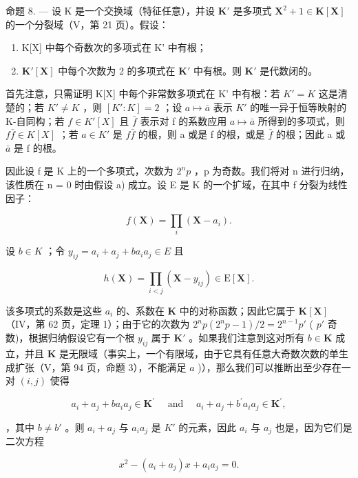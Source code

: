 命题 8. --- 设 K 是一个交换域（特征任意），并设 \(\mathbf{K}'\) 是多项式 \(\mathbf{X}^2 + 1 \in \mathbf{K}[\mathbf{X}]\) 的一个分裂域（V，第 21 页）。假设：

\begin{enumerate}
\def\labelenumi{\alph{enumi})}
\item
  K{[}X{]} 中每个奇数次的多项式在 K' 中有根；
\item
  \(\mathbf{K}'[\mathbf{X}]\) 中每个次数为 2 的多项式在 \(\mathbf{K}'\) 中有根。则 \(\mathbf{K}'\) 是代数闭的。
\end{enumerate}

首先注意，只需证明 K{[}X{]} 中每个非常数多项式在 K' 中有根：若 \(K' = K\) 这是清楚的；若 \(K' \neq K\) ，则 \([K': K] = 2\) ；设 \(a \mapsto \bar{a}\) 表示 \(K'\) 的唯一异于恒等映射的 K-自同构；若 \(f \in K'[X]\) 且 \(\bar{f}\) 表示对 f 的系数应用 \(a \mapsto \bar{a}\) 所得到的多项式，则 \(f\bar{f} \in K[X]\) ；若 \(a \in K'\) 是 \(f\bar{f}\) 的根，则 a 或是 f 的根，或是 \(\bar{f}\) 的根；因此 a 或 \(\bar{a}\) 是 f 的根。

因此设 f 是 K 上的一个多项式，次数为 \(2^{n}p\) ，p 为奇数。我们将对 n 进行归纳，该性质在 n = 0 时由假设 a) 成立。设 E 是 K 的一个扩域，在其中 f 分裂为线性因子：

\[
f (\mathbf {X}) = \prod_ {i} \left(\mathbf {X} - a _ {i}\right).
\]

设 \(b \in K\) ；令 \(y_{ij} = a_i + a_j + ba_i a_j \in E\) 且

\[
h (\mathbf {X}) = \prod_ {i <   j} \left(\mathbf {X} - y _ {i j}\right) \in \mathrm{E} [ \mathbf {X} ].
\]

该多项式的系数是这些 \(a_i\) 的、系数在 \(\mathbf{K}\) 中的对称函数；因此它属于 \(\mathbf{K}[\mathbf{X}]\) （IV，第 62 页，定理 1）；由于它的次数为 \(2^n p(2^n p - 1)/2 = 2^{n-1}p'\) ( \(p'\) 奇数)，根据归纳假设它有一个根 \(y_{ij}\) 属于 \(\mathbf{K}'\) 。如果我们注意到这对所有 \(b \in \mathbf{K}\) 成立，并且 \(\mathbf{K}\) 是无限域（事实上，一个有限域，由于它具有任意大奇数次数的单生成扩张（V，第 94 页，命题 3），不能满足 \(a\) )），那么我们可以推断出至少存在一对 \((i,j)\) 使得

\[
a _ {i} + a _ {j} + b a _ {i} a _ {j} \in \mathbf {K} ^ {\prime} \quad \text { and } \quad a _ {i} + a _ {j} + b ^ {\prime} a _ {i} a _ {j} \in \mathbf {K} ^ {\prime},
\]

，其中 \(b \neq b'\) 。则 \(a_i + a_j\) 与 \(a_i a_j\) 是 \(K'\) 的元素，因此 \(a_i\) 与 \(a_j\) 也是，因为它们是二次方程

\[
x ^ {2} - \left(a _ {i} + a _ {j}\right) x + a _ {i} a _ {j} = 0.\tag{Q.E.D.}
\]

